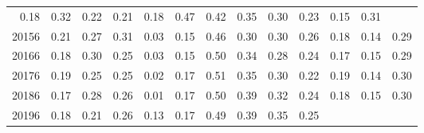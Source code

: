 \begin{table}[!h]
\begin{tabular}{lllllllllllll}
  \multicolumn{1}{|r}{0.18} &
  \multicolumn{1}{r}{0.32} &
  \multicolumn{1}{r}{0.22} &
  \multicolumn{1}{r}{0.21} &
  \multicolumn{1}{r}{0.18} &
  \multicolumn{1}{r}{0.47} &
  \multicolumn{1}{r}{0.42} &
  \multicolumn{1}{r}{0.35} &
  \multicolumn{1}{r}{0.30} &
  \multicolumn{1}{r}{0.23} &
  \multicolumn{1}{r}{0.15} &
  \multicolumn{1}{r}{0.31} \\
\multicolumn{1}{l}{\hspace{1em}20156} &
  \multicolumn{1}{|r}{0.21} &
  \multicolumn{1}{r}{0.27} &
  \multicolumn{1}{r}{0.31} &
  \multicolumn{1}{r}{0.03} &
  \multicolumn{1}{r}{0.15} &
  \multicolumn{1}{r}{0.46} &
  \multicolumn{1}{r}{0.30} &
  \multicolumn{1}{r}{0.30} &
  \multicolumn{1}{r}{0.26} &
  \multicolumn{1}{r}{0.18} &
  \multicolumn{1}{r}{0.14} &
  \multicolumn{1}{r}{0.29} \\
\multicolumn{1}{l}{\hspace{1em}20166} &
  \multicolumn{1}{|r}{0.18} &
  \multicolumn{1}{r}{0.30} &
  \multicolumn{1}{r}{0.25} &
  \multicolumn{1}{r}{0.03} &
  \multicolumn{1}{r}{0.15} &
  \multicolumn{1}{r}{0.50} &
  \multicolumn{1}{r}{0.34} &
  \multicolumn{1}{r}{0.28} &
  \multicolumn{1}{r}{0.24} &
  \multicolumn{1}{r}{0.17} &
  \multicolumn{1}{r}{0.15} &
  \multicolumn{1}{r}{0.29} \\
\multicolumn{1}{l}{\hspace{1em}20176} &
  \multicolumn{1}{|r}{0.19} &
  \multicolumn{1}{r}{0.25} &
  \multicolumn{1}{r}{0.25} &
  \multicolumn{1}{r}{0.02} &
  \multicolumn{1}{r}{0.17} &
  \multicolumn{1}{r}{0.51} &
  \multicolumn{1}{r}{0.35} &
  \multicolumn{1}{r}{0.30} &
  \multicolumn{1}{r}{0.22} &
  \multicolumn{1}{r}{0.19} &
  \multicolumn{1}{r}{0.14} &
  \multicolumn{1}{r}{0.30} \\
\multicolumn{1}{l}{\hspace{1em}20186} &
  \multicolumn{1}{|r}{0.17} &
  \multicolumn{1}{r}{0.28} &
  \multicolumn{1}{r}{0.26} &
  \multicolumn{1}{r}{0.01} &
  \multicolumn{1}{r}{0.17} &
  \multicolumn{1}{r}{0.50} &
  \multicolumn{1}{r}{0.39} &
  \multicolumn{1}{r}{0.32} &
  \multicolumn{1}{r}{0.24} &
  \multicolumn{1}{r}{0.18} &
  \multicolumn{1}{r}{0.15} &
  \multicolumn{1}{r}{0.30} \\
\multicolumn{1}{l}{\hspace{1em}20196} &
  \multicolumn{1}{|r}{0.18} &
  \multicolumn{1}{r}{0.21} &
  \multicolumn{1}{r}{0.26} &
  \multicolumn{1}{r}{0.13} &
  \multicolumn{1}{r}{0.17} &
  \multicolumn{1}{r}{0.49} &
  \multicolumn{1}{r}{0.39} &
  \multicolumn{1}{r}{0.35} &
  \multicolumn{1}{r}{0.25} &

\end{tabular}
\end{table}

